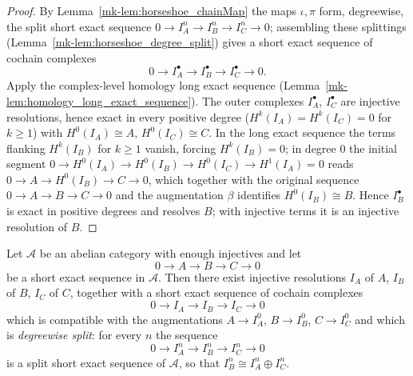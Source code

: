 \begin{proof}
  By Lemma~\ref{mk-lem:horseshoe_chainMap} the maps \(\iota, \pi\) form, degreewise, the
  split short exact sequence \(0 \to I_A^n \to I_B^n \to I_C^n \to 0\); assembling these
  splittings (Lemma~\ref{mk-lem:horseshoe_degree_split}) gives a short exact sequence of
  cochain complexes
  \[
    0 \longrightarrow I_A^\bullet \longrightarrow I_B^\bullet
      \longrightarrow I_C^\bullet \longrightarrow 0 .
  \]
  Apply the complex-level homology long exact sequence
  (Lemma~\ref{mk-lem:homology_long_exact_sequence}). The outer complexes \(I_A^\bullet\),
  \(I_C^\bullet\) are injective resolutions, hence exact in every positive degree
  (\(H^{k}(I_A) = H^{k}(I_C) = 0\) for \(k \geq 1\)) with \(H^0(I_A) \cong A\),
  \(H^0(I_C) \cong C\). In the long exact sequence the terms flanking \(H^{k}(I_B)\) for
  \(k \geq 1\) vanish, forcing \(H^{k}(I_B) = 0\); in degree \(0\) the initial segment
  \(0 \to H^0(I_A) \to H^0(I_B) \to H^0(I_C) \to H^1(I_A) = 0\) reads
  \(0 \to A \to H^0(I_B) \to C \to 0\), which together with the original sequence
  \(0 \to A \to B \to C \to 0\) and the augmentation \(\beta\) identifies
  \(H^0(I_B) \cong B\). Hence \(I_B^\bullet\) is exact in positive degrees and resolves
  \(B\); with injective terms it is an injective resolution of \(B\).
\end{proof}

\begin{lemma}\label{mk-lem:injective_resolution_of_ses}
  \leanok

  Let \(\mathcal{A}\) be an abelian category with enough injectives and let
  \[
    0 \longrightarrow A \longrightarrow B \longrightarrow C \longrightarrow 0
  \]
  be a short exact sequence in \(\mathcal{A}\). Then there exist injective
  resolutions \(I_A\) of \(A\), \(I_B\) of \(B\), \(I_C\) of \(C\), together with a
  short exact sequence of cochain complexes
  \[
    0 \longrightarrow I_A \longrightarrow I_B \longrightarrow I_C \longrightarrow 0
  \]
  which is compatible with the augmentations \(A \to I_A^0\), \(B \to I_B^0\),
  \(C \to I_C^0\) and which is \emph{degreewise split}: for every \(n\) the sequence
  \[
    0 \longrightarrow I_A^n \longrightarrow I_B^n \longrightarrow I_C^n
      \longrightarrow 0
  \]
  is a split short exact sequence of \(\mathcal{A}\), so that
  \(I_B^n \cong I_A^n \oplus I_C^n\).
\end{lemma}

